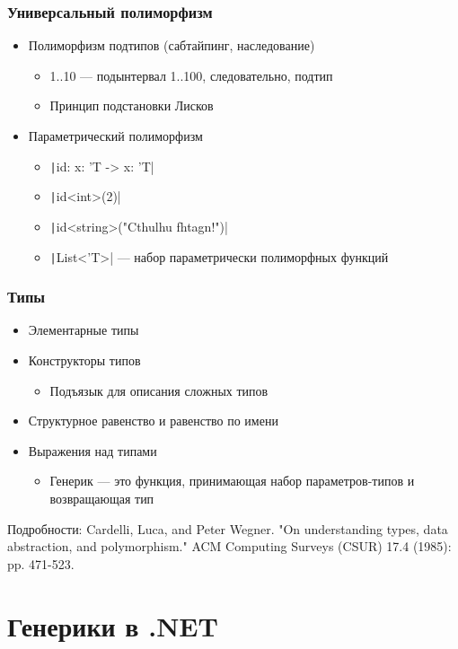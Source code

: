 \documentclass[xetex,mathserif,serif]{beamer}
\begin{document}
	\begin{frame}
		\frametitle{Универсальный полиморфизм}
		\begin{itemize}
			\item Полиморфизм подтипов (сабтайпинг, наследование)
			\begin{itemize}
				\item 1..10 --- подынтервал 1..100, следовательно, подтип
				\item Принцип подстановки Лисков
			\end{itemize}
			\item Параметрический полиморфизм
			\begin{itemize}
				\item \texttt|id: x: 'T -> x: 'T|
				\item \texttt|id<int>(2)|
				\item \texttt|id<string>("Cthulhu fhtagn!")|
				\item \texttt|List<'T>| --- набор параметрически полиморфных функций
			\end{itemize}
		\end{itemize}
	\end{frame}

	\begin{frame}
		\frametitle{Типы}
		\begin{itemize}
			\item Элементарные типы
			\item Конструкторы типов
			\begin{itemize}
				\item Подъязык для описания сложных типов
			\end{itemize}
			\item Структурное равенство и равенство по имени
			\item Выражения над типами
			\begin{itemize}
				\item Генерик --- это функция, принимающая набор параметров-типов и возвращающая тип
			\end{itemize}
		\end{itemize}

		Подробности: Cardelli, Luca, and Peter Wegner. "On understanding types, data abstraction, and polymorphism." ACM Computing Surveys (CSUR) 17.4 (1985): pp. 471-523.
	\end{frame}

	\section{Генерики в .NET}
\end{document}
